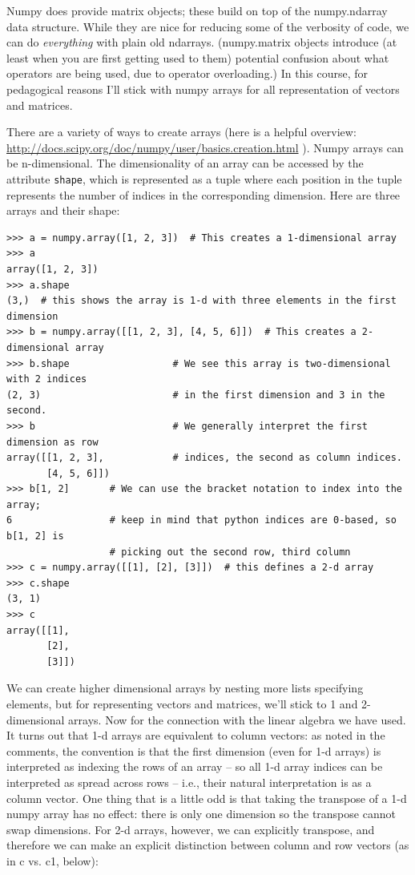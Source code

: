 \documentclass[10pt]{article}
\begin{document}
Numpy does provide matrix objects; these build on top of the numpy.ndarray data structure.  While they are nice for reducing some of the verbosity of code, we can do {\em everything} with plain old ndarrays.  (numpy.matrix objects introduce (at least when you are first getting used to them) potential confusion about what operators are being used, due to operator overloading.)  In this course, for pedagogical reasons I'll stick with numpy arrays for all representation of vectors and matrices.

There are a variety of ways to create arrays (here is a helpful overview: \url{http://docs.scipy.org/doc/numpy/user/basics.creation.html} ). Numpy arrays can be n-dimensional.  The dimensionality of an array can be accessed by the attribute {\tt shape}, which is represented as a tuple where each position in the tuple represents the number of indices in the corresponding dimension.  Here are three arrays and their shape:
\begin{verbatim}
>>> a = numpy.array([1, 2, 3])  # This creates a 1-dimensional array
>>> a
array([1, 2, 3]) 
>>> a.shape
(3,)  # this shows the array is 1-d with three elements in the first dimension
>>> b = numpy.array([[1, 2, 3], [4, 5, 6]])  # This creates a 2-dimensional array
>>> b.shape                  # We see this array is two-dimensional with 2 indices 
(2, 3)                       # in the first dimension and 3 in the second.
>>> b                        # We generally interpret the first dimension as row  
array([[1, 2, 3],            # indices, the second as column indices.
       [4, 5, 6]])
>>> b[1, 2]       # We can use the bracket notation to index into the array;
6                 # keep in mind that python indices are 0-based, so b[1, 2] is
                  # picking out the second row, third column
>>> c = numpy.array([[1], [2], [3]])  # this defines a 2-d array
>>> c.shape
(3, 1)
>>> c
array([[1],
       [2],
       [3]])
\end{verbatim}
We can create higher dimensional arrays by nesting more lists specifying elements, but for representing vectors and matrices, we'll stick to 1 and 2-dimensional arrays.  Now for the connection with the linear algebra we have used.  It turns out that 1-d arrays are equivalent to column vectors: as noted in the comments, the convention is that the first dimension (even for 1-d arrays) is interpreted as indexing the rows of an array -- so all 1-d array indices can be interpreted as spread across rows -- i.e., their natural interpretation is as a column vector.  One thing that is a little odd is that taking the transpose of a 1-d numpy array has no effect: there is only one dimension so the transpose cannot swap dimensions.  For 2-d arrays, however, we can explicitly transpose, and therefore we can make an explicit distinction between column and row vectors (as in c vs. c1, below):
\end{document}
